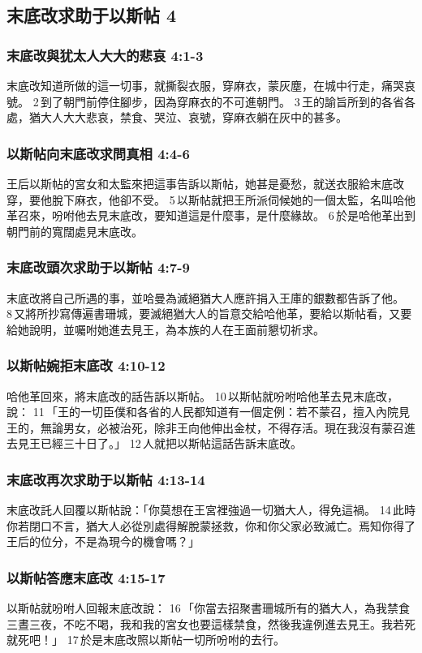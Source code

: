 \subsection{末底改求助于以斯帖 4}
\subsubsection{末底改與犹太人大大的悲哀 4:1-3}
末底改知道所做的這一切事，就撕裂衣服，穿麻衣，蒙灰塵，在城中行走，痛哭哀號。 2 到了朝門前停住腳步，因為穿麻衣的不可進朝門。 3 王的諭旨所到的各省各處，猶大人大大悲哀，禁食、哭泣、哀號，穿麻衣躺在灰中的甚多。

\subsubsection{以斯帖向末底改求問真相 4:4-6}
王后以斯帖的宮女和太監來把這事告訴以斯帖，她甚是憂愁，就送衣服給末底改穿，要他脫下麻衣，他卻不受。 5 以斯帖就把王所派伺候她的一個太監，名叫哈他革召來，吩咐他去見末底改，要知道這是什麼事，是什麼緣故。 6 於是哈他革出到朝門前的寬闊處見末底改。 

\subsubsection{末底改頭次求助于以斯帖 4:7-9}
末底改將自己所遇的事，並哈曼為滅絕猶大人應許捐入王庫的銀數都告訴了他。 8 又將所抄寫傳遍書珊城，要滅絕猶大人的旨意交給哈他革，要給以斯帖看，又要給她說明，並囑咐她進去見王，為本族的人在王面前懇切祈求。

\subsubsection{以斯帖婉拒末底改 4:10-12}
哈他革回來，將末底改的話告訴以斯帖。 10 以斯帖就吩咐哈他革去見末底改，說： 11 「王的一切臣僕和各省的人民都知道有一個定例：若不蒙召，擅入內院見王的，無論男女，必被治死，除非王向他伸出金杖，不得存活。現在我沒有蒙召進去見王已經三十日了。」 12 人就把以斯帖這話告訴末底改。

\subsubsection{末底改再次求助于以斯帖 4:13-14}
末底改託人回覆以斯帖說：「你莫想在王宮裡強過一切猶大人，得免這禍。 14 此時你若閉口不言，猶大人必從別處得解脫蒙拯救，你和你父家必致滅亡。焉知你得了王后的位分，不是為現今的機會嗎？」

\subsubsection{以斯帖答應末底改 4:15-17}
以斯帖就吩咐人回報末底改說： 16 「你當去招聚書珊城所有的猶大人，為我禁食三晝三夜，不吃不喝，我和我的宮女也要這樣禁食，然後我違例進去見王。我若死就死吧！」 17 於是末底改照以斯帖一切所吩咐的去行。



